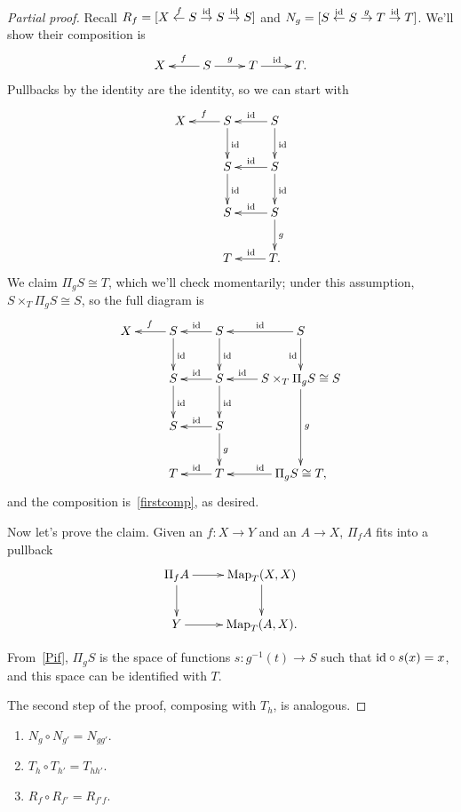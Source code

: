 \begin{proof}[Partial proof]
Recall $R_f = [X\stackrel f\gets S\stackrel{\mathrm{id}}\to S\stackrel{\mathrm{id}}\to S]$ and $N_g = [S\stackrel{\mathrm{id}}\gets S\stackrel
g\to T\stackrel{\mathrm{id}}\to T]$. We'll show their composition is
\begin{equation}
\label{firstcomp}
\xymatrix{
	X & S\ar[l]_f\ar[r]^g & T\ar[r]^\id &T.
}
\end{equation}
Pullbacks by the identity are the identity, so we can start with
\[\xymatrix{
X & S\ar[l]_f\ar[d]^\id & S\ar[l]_\id\ar[d]^\id\\
& S\ar[d]^\id & S\ar[l]_\id\ar[d]^\id\\
& S & S\ar[l]_\id\ar[d]^g\\
& T & T.\ar[l]_\id
}\]
We claim $\Pi_gS\cong T$, which we'll check momentarily; under this assumption, $S\times_T \Pi_g S\cong S$, so the
full diagram is
\[\xymatrix{
X & S\ar[l]_f\ar[d]^\id & S\ar[l]_\id\ar[d]^\id &S\ar[l]_\id\ar[d]_\id\\
& S\ar[d]^\id & S\ar[l]_\id\ar[d]^\id & S\times_T\Pi_gS\cong S\ar[dd]^g\ar[l]_-\id\\
& S & S\ar[l]_\id\ar[d]^g\\
& T & T\ar[l]_\id & \Pi_g S\cong T,\ar[l]_\id
}\]
and the composition is~\eqref{firstcomp}, as desired.

Now let's prove the claim. Given an $f\colon X\to Y$ and an $A\to X$, $\Pi_f A$ fits into a pullback
\begin{equation}
\label{Pif}
\gathxy{
	\Pi_f A\ar[r]\ar[d] & \Map_T(X,X)\ar[d]\\
	Y\ar[r] & \Map_T(A,X).
}
\end{equation}

From~\eqref{Pif}, $\Pi_g S$ is the space of functions $s\colon g^{-1}(t)\to S$ such that $\mathrm{id}\circ s(x) = x$, and
this space can be identified with $T$.

The second step of the proof, composing with $T_h$, is analogous.
\end{proof}
\begin{prop}\hfill
\label{NTRcomp}
\begin{enumerate}
	\item $N_g\circ N_{g'} = N_{gg'}$.
	\item\label{hh'} $T_h\circ T_{h'} = T_{hh'}$.
	\item $R_f\circ R_{f'} = R_{f'f}$.
\end{enumerate}
\end{prop}
